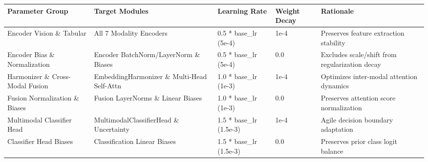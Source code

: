 \begin{tabular}{lllll}
\toprule
Parameter Group & Target Modules & Learning Rate & Weight Decay & Rationale \\
\midrule
Encoder Vision \& Tabular & All 7 Modality Encoders & 0.5 * base\_lr (5e-4) & 1e-4 & Preserves feature extraction stability \\
Encoder Bias \& Normalization & Encoder BatchNorm/LayerNorm \& Biases & 0.5 * base\_lr (5e-4) & 0.0 & Excludes scale/shift from regularization decay \\
Harmonizer \& Cross-Modal Fusion & EmbeddingHarmonizer \& Multi-Head Self-Attn & 1.0 * base\_lr (1e-3) & 1e-4 & Optimizes inter-modal attention dynamics \\
Fusion Normalization \& Biases & Fusion LayerNorms \& Linear Biases & 1.0 * base\_lr (1e-3) & 0.0 & Preserves attention score normalization \\
Multimodal Classifier Head & MultimodalClassifierHead \& Uncertainty & 1.5 * base\_lr (1.5e-3) & 1e-4 & Agile decision boundary adaptation \\
Classifier Head Biases & Classification Linear Biases & 1.5 * base\_lr (1.5e-3) & 0.0 & Preserves prior class logit balance \\
\bottomrule
\end{tabular}
